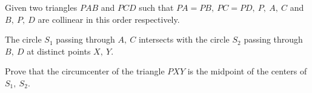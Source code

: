 Given two triangles $PAB$ and $PCD$ such that $PA=PB,\ PC=PD,\ P,\ A,\ C$ and $B,\ P,\ D$ are collinear in this order respectively.

The circle $S_1$ passing through $A,\ C$ intersects with the circle $S_2$ passing through $B,\ D$ at distinct points $X,\ Y$.

Prove that the circumcenter of the triangle $PXY$ is the midpoint of the centers of $S_1,\ S_2$.
